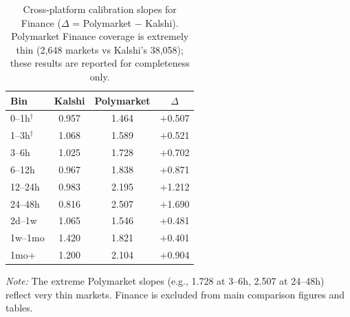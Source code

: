 \documentclass[11pt,a4paper]{article}
\begin{document}
\begin{table}[!ht]
\caption{Cross-platform calibration slopes for Finance ($\Delta$ = Polymarket $-$ Kalshi). Polymarket Finance coverage is extremely thin (2,648 markets vs Kalshi's 38,058); these results are reported for completeness only.\label{tab:cp_finance}}
\centering
\small
\begin{tabular}{lccc}
\toprule
Bin & Kalshi & Polymarket & $\Delta$ \\
\midrule
0--1h$^\dagger$  & 0.957 & 1.464 & $+$0.507 \\
1--3h$^\dagger$  & 1.068 & 1.589 & $+$0.521 \\
3--6h            & 1.025 & 1.728 & $+$0.702 \\
6--12h           & 0.967 & 1.838 & $+$0.871 \\
12--24h          & 0.983 & 2.195 & $+$1.212 \\
24--48h          & 0.816 & 2.507 & $+$1.690 \\
2d--1w           & 1.065 & 1.546 & $+$0.481 \\
1w--1mo          & 1.420 & 1.821 & $+$0.401 \\
1mo+             & 1.200 & 2.104 & $+$0.904 \\
\bottomrule
\end{tabular}
\begin{flushleft}
\small\textit{Note:} The extreme Polymarket slopes (e.g., 1.728 at 3--6h, 2.507 at 24--48h) reflect very thin markets. Finance is excluded from main comparison figures and tables.
\end{flushleft}
\end{table}
\end{document}
